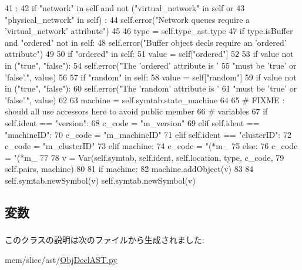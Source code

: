 \begin{DoxyCode}
41                       :
42         if "network" in self and not ("virtual_network" in self or
43                                       "physical_network" in self) :
44             self.error("Network queues require a 'virtual_network' attribute")
45 
46         type = self.type_ast.type
47         if type.isBuffer and "ordered" not in self:
48             self.error("Buffer object decls require an 'ordered' attribute")
49 
50         if "ordered" in self:
51             value = self["ordered"]
52 
53             if value not in ("true", "false"):
54                 self.error("The 'ordered' attribute is '%
55                            "must be 'true' or 'false'.", value)
56 
57         if "random" in self:
58             value = self["random"]
59             if value not in ("true", "false"):
60                 self.error("The 'random' attribute is '%
61                            "must be 'true' or 'false'.", value)
62 
63         machine = self.symtab.state_machine
64 
65         # FIXME : should all use accessors here to avoid public member
66         # variables
67         if self.ident == "version":
68             c_code = "m_version"
69         elif self.ident == "machineID":
70             c_code = "m_machineID"
71         elif self.ident == "clusterID":
72             c_code = "m_clusterID"
73         elif machine:
74             c_code = "(*m_%
75         else:
76             c_code = "(*m_%
77 
78         v = Var(self.symtab, self.ident, self.location, type, c_code,
79                 self.pairs, machine)
80 
81         if machine:
82             machine.addObject(v)
83 
84         self.symtab.newSymbol(v)
        self.symtab.newSymbol(v)
\end{DoxyCode}


\subsection{変数}
\hypertarget{classslicc_1_1ast_1_1ObjDeclAST_1_1ObjDeclAST_a2fe57e2d3d2cba9a3aeba2f629eaa78b}{
\subsubsection[{ident}]{}}
\label{classslicc_1_1ast_1_1ObjDeclAST_1_1ObjDeclAST_a2fe57e2d3d2cba9a3aeba2f629eaa78b}
\hypertarget{classslicc_1_1ast_1_1ObjDeclAST_1_1ObjDeclAST_a2c41e611550596541faa6f64ffecc139}{
\subsubsection[{type\_\-ast}]{}}
\label{classslicc_1_1ast_1_1ObjDeclAST_1_1ObjDeclAST_a2c41e611550596541faa6f64ffecc139}


このクラスの説明は次のファイルから生成されました:\begin{DoxyCompactItemize}
\item 
mem/slicc/ast/\hyperlink{ObjDeclAST_8py}{ObjDeclAST.py}\end{DoxyCompactItemize}
